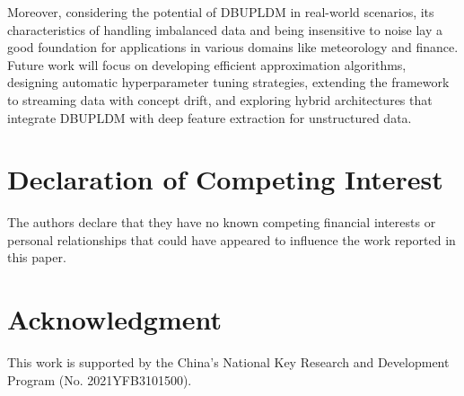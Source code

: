 \documentclass[a4paper]{cas-sc}
\begin{document}
{\color{blue}Moreover, considering the potential of DBUPLDM in real-world scenarios, its characteristics of handling imbalanced data and being insensitive to noise lay a good foundation for applications in various domains like meteorology and finance. {\color{magenta}Future work will focus on developing efficient approximation algorithms, designing automatic hyperparameter tuning strategies, extending the framework to streaming data with concept drift, and exploring hybrid architectures that integrate DBUPLDM with deep feature extraction for unstructured data.}}

\printcredits

\section*{Declaration of Competing Interest}
The authors declare that they have no known competing financial interests or personal relationships that could have appeared to influence the work reported in this paper.

\section*{Acknowledgment}
This work is supported by the China's National Key Research and Development Program (No. 2021YFB3101500).

 




\end{document}
